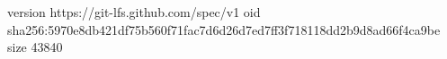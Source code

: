 version https://git-lfs.github.com/spec/v1
oid sha256:5970e8db421df75b560f71fac7d6d26d7ed7ff3f718118dd2b9d8ad66f4ca9be
size 43840
